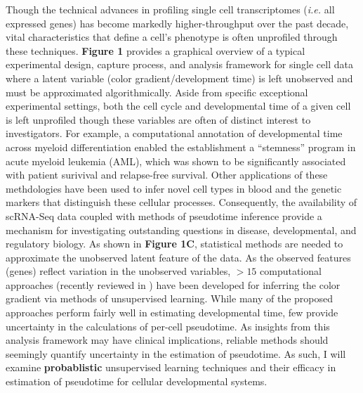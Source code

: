 \documentclass[english, 11pt]{article}\usepackage[]{graphicx}\usepackage[]{color}
\begin{document}
Though the technical advances in profiling single cell transcriptomes (\textit{i.e.} all expressed genes) has become markedly higher-throughput over the past decade, vital characteristics that define a cell's phenotype is often unprofiled through these techniques. \textbf{Figure 1} provides a graphical overview of a typical experimental design, capture process, and analysis framework for single cell data where a latent variable (color gradient/development time) is left unobserved and must be approximated algorithmically. Aside from specific exceptional experimental settings, both the cell cycle and developmental time of a given cell is left unprofiled though these variables are often of distinct interest to investigators. For example, a computational annotation of developmental time across myeloid differentiation enabled the establishment a ``stemness'' program in acute myeloid leukemia (AML), which was shown to be significantly associated with patient surivival and relapse-free survival. \cite{corces2016lineage} Other applications of these methdologies have been used to infer novel cell types in blood \cite{buenrostro2017single} and the genetic markers that distinguish these cellular processes. Consequently, the availability of scRNA-Seq data coupled with methods of pseudotime inference provide a mechanism for investigating outstanding questions in disease, developmental, and regulatory biology.  \newline \newline
\noindent As shown in \textbf{Figure 1C}, statistical methods are needed to approximate the unobserved latent feature of the data. As the observed features (genes) reflect variation in the unobserved variables, $>15$ computational approaches (recently reviewed in \cite{cannoodt2016computational}) have been developed for inferring the color gradient via methods of unsupervised learning. While many of the proposed approaches perform fairly well in estimating developmental time, few provide uncertainty in the calculations of per-cell pseudotime. As insights from this analysis framework may have clinical \cite{corces2016lineage} implications, reliable methods should seemingly quantify uncertainty in the estimation of pseudotime. As such, I will examine \textbf{probablistic} unsupervised learning techniques and their efficacy in estimation of pseudotime for cellular developmental systems.
\end{document}
